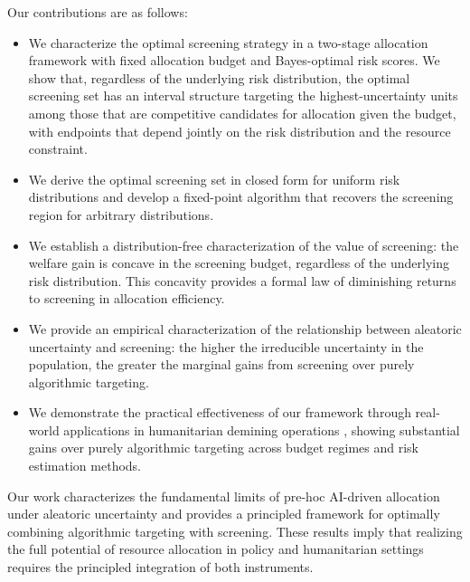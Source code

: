 Our contributions are as follows:
\begin{itemize}
    \item We characterize the optimal screening strategy in a two-stage allocation framework with fixed allocation budget and Bayes-optimal risk scores. We show that, regardless of the underlying risk distribution, the optimal screening set has an interval structure targeting the highest-uncertainty units among those that are competitive candidates for allocation given the budget, with endpoints that depend jointly on the risk distribution and the resource constraint.


    \item We derive the optimal screening set in closed form for uniform risk distributions and develop a fixed-point algorithm that recovers the screening region for arbitrary distributions.
   
    \item We establish a distribution-free characterization of the value of screening: the welfare gain is concave in the screening budget, regardless of the underlying risk distribution. This concavity provides a formal law of diminishing returns to screening in allocation efficiency.        
    \item We provide an empirical characterization of the relationship between aleatoric uncertainty and screening: the higher the irreducible uncertainty in the population, the greater the marginal gains from screening over purely algorithmic targeting.
    
    \item We demonstrate the practical effectiveness of our framework through real-world applications in humanitarian demining operations%
    , showing substantial gains over purely algorithmic targeting across budget regimes and risk estimation methods.
    
\end{itemize}

Our work characterizes the fundamental limits of pre-hoc AI-driven allocation under aleatoric uncertainty and provides a principled framework for optimally combining algorithmic targeting with screening. These results imply that realizing the full potential of resource allocation in policy and humanitarian settings requires the principled integration of both instruments.



